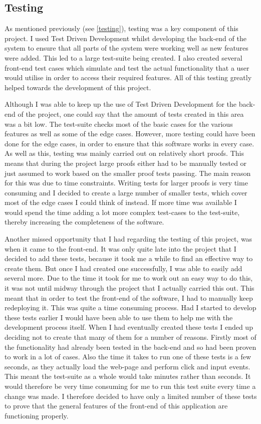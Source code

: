 \subsection{Testing}
As mentioned previously (see \ref{testing}), testing was a key component of this project. I used Test Driven Development whilst developing the back-end of the system to ensure that all parts of the system were working well as new features were added. This led to a large test-suite being created. I also created several front-end test cases which simulate and test the actual functionality that a user would utilise in order to access their required features. All of this testing greatly helped towards the development of this project.

Although I was able to keep up the use of Test Driven Development for the back-end of the project, one could say that the amount of tests created in this area was a bit low. The test-suite checks most of the basic cases for the various features as well as some of the edge cases. However, more testing could have been done for the edge cases, in order to ensure that this software works in every case. As well as this, testing was mainly carried out on relatively short proofs. This means that during the project large proofs either had to be manually tested or just assumed to work based on the smaller proof tests passing. The main reason for this was due to time constraints. Writing tests for larger proofs is very time consuming and I decided to create a large number of smaller tests, which cover most of the edge cases I could think of instead. If more time was available I would spend the time adding a lot more complex test-cases to the test-suite, thereby increasing the completeness of the software.

Another missed opportunity that I had regarding the testing of this project, was when it came to the front-end. It was only quite late into the project that I decided to add these tests, because it took me a while to find an effective way to create them. But once I had created one successfully, I was able to easily add several more. Due to the time it took for me to work out an easy way to do this, it was not until midway through the project that I actually carried this out. This meant that in order to test the front-end of the software, I had to manually keep redeploying it. This was quite a time consuming process. Had I started to develop these tests earlier I would have been able to use them to help me with the development process itself. When I had eventually created these tests I ended up deciding not to create that many of them for a number of reasons. Firstly most of the functionality had already been tested in the back-end and so had been proven to work in a lot of cases. Also the time it takes to run one of these tests is a few seconds, as they actually load the web-page and perform click and input events. This meant the test-suite as a whole would take minutes rather than seconds. It would therefore be very time consuming for me to run this test suite every time a change was made. I therefore decided to have only a limited number of these tests to prove that the general features of the front-end of this application are functioning properly.

